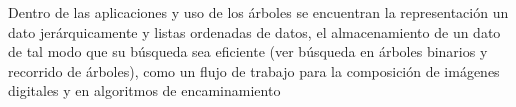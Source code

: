 Dentro de las aplicaciones y uso de los árboles se encuentran la representación un dato jerárquicamente y listas ordenadas de datos, el almacenamiento de un dato de tal modo que su búsqueda sea eficiente (ver búsqueda en árboles binarios y recorrido de árboles), como un flujo de trabajo para la composición de imágenes digitales y en algoritmos de encaminamiento